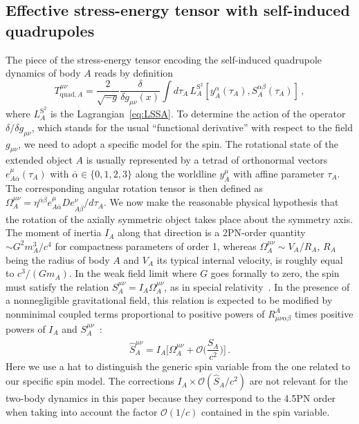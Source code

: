 \documentclass[aps, prd,
twocolumn,%
superscriptaddress,
showpacs, nofootinbib, eqsecnum, amsmath, amssymb, floatfix
]{revtex4}
\begin{document}
\subsection{Effective stress-energy tensor with self-induced quadrupoles}

The piece of the stress-energy tensor encoding the self-induced quadrupole
dynamics of body $A$ reads by definition
%
\begin{equation} \label{eq:TSSAdef}
T^{\mu\nu}_{\text{quad},A} = \frac{2}{\sqrt{-g}} \frac{\delta}{\delta g_{\mu\nu}(x)}
\int d\tau_A\, L^{\text{S}^2}_A[y_A^\alpha(\tau_A), S^{\alpha\beta}_A(\tau_A)] \, ,
\end{equation}
%
where $L_A^{\text{S}^2}$ is the Lagrangian~\eqref{eq:LSSA}. To
determine the action of the operator $\delta/\delta g_{\mu\nu}$,
which stands for the usual ``functional derivative'' with respect to
the field $g_{\mu\nu}$, we need to adopt a specific model for the
spin. The rotational state of the extended object $A$ is usually
represented by a tetrad of orthonormal vectors
$e^{\mu}_{A\overline{\alpha}}(\tau_A)$ with $\overline{\alpha} \in
\{0,1,2,3\}$ along the worldline $y^\mu_A$ with affine parameter
$\tau_A$. The corresponding angular rotation tensor is then defined
as $\Omega^{\mu\nu}_A = \eta^{\overline{\alpha}\overline{\beta}}
e_{A\overline{\alpha}}^{\mu} D e^\nu_{A\overline{\beta}}/d\tau_A$.
We now make the reasonable physical hypothesis that the rotation of
the axially symmetric object takes place about the symmetry axis.
The moment of inertia $I_A$ along that direction is a 2PN-order
quantity $ \sim G^2 m_A^3/c^4$ for compactness parameters of order
1, whereas $\Omega^{\mu\nu}_A \sim V_A/R_A$, $R_A$ being the radius
of body $A$ and $V_A$ its typical internal velocity, is roughly
equal to $ c^3/(G m_A)$. In the weak field limit where $G$ goes
formally to zero, the spin must satisfy the relation $S^{\mu\nu}_A =
I_A \Omega^{\mu\nu}_A$, as in special relativity~\cite{HR74}. In the
presence of a nonnegligible gravitational field, this relation is
expected to be modified by nonminimal coupled terms proportional to
positive powers of $R^A_{\mu\nu\alpha\beta}$ times positive powers
of $I_A$ and $S^{\mu\nu}_A$~\cite{Porto:2005ac}:
%
\begin{equation} \label{eq:hatspin}
\hat{S}_A^{\mu\nu} = I_A
\Big[ \Omega_A^{\mu\nu} + \mathcal{O}\Big(\frac{\hat{S}_A}{c^2}\Big) \Big] \, .
\end{equation}
%
Here we use a hat to distinguish the generic spin variable from the
one related to our specific spin model. The corrections $ I_A\times
\mathcal{O}(\hat{S}_A/c^2)$ are not relevant for the two-body
dynamics in this paper because they correspond to the 4.5PN order
when taking into account the factor $\mathcal{O}(1/c)$ contained in
the spin variable.
\end{document}
